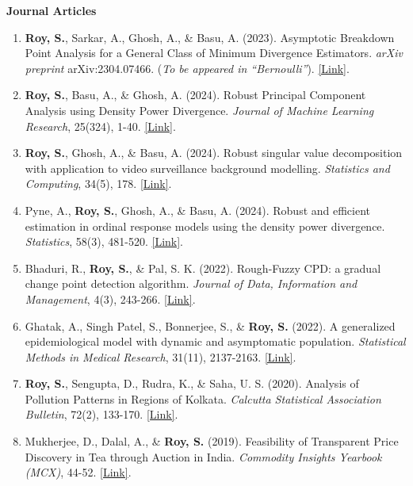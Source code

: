 \documentclass[10pt]{developercv} %
\begin{document}
\vspace{-15 pt}

\textbf{Journal Articles}
\begin{enumerate}
    \item \textbf{Roy, S.}, Sarkar, A., Ghosh, A., \& Basu, A. (2023). Asymptotic Breakdown Point Analysis for a General Class of Minimum Divergence Estimators. \emph{arXiv preprint} arXiv:2304.07466. (\textit{To be appeared in ``Bernoulli''}). \href{https://arxiv.org/abs/2304.07466}{[Link]}.
    \item \textbf{Roy, S.}, Basu, A., \& Ghosh, A. (2024). Robust Principal Component Analysis using Density Power Divergence. \emph{Journal of Machine Learning Research}, 25(324), 1-40. \href{https://www.jmlr.org/papers/v25/23-1096.html}{[Link]}.
    \item \textbf{Roy, S.}, Ghosh, A., \& Basu, A. (2024). Robust singular value decomposition with application to video surveillance background modelling. \emph{Statistics and Computing}, 34(5), 178. \href{https://link.springer.com/article/10.1007/s11222-024-10493-7}{[Link]}.
    \item Pyne, A., \textbf{Roy, S.}, Ghosh, A., \& Basu, A. (2024). Robust and efficient estimation in ordinal response models using the density power divergence. \emph{Statistics}, 58(3), 481-520. \href{https://www.tandfonline.com/doi/abs/10.1080/02331888.2024.2347329}{[Link]}.        
    \item Bhaduri, R., \textbf{Roy, S.}, \& Pal, S. K. (2022). Rough-Fuzzy CPD: a gradual change point detection algorithm. \emph{Journal of Data, Information and Management}, 4(3), 243-266. \href{https://link.springer.com/article/10.1007/s42488-022-00077-3}{[Link]}.
    \item Ghatak, A., Singh Patel, S., Bonnerjee, S., \& \textbf{Roy, S.} (2022). A generalized epidemiological model with dynamic and asymptomatic population. \emph{Statistical Methods in Medical Research}, 31(11), 2137-2163. \href{https://journals.sagepub.com/doi/abs/10.1177/09622802221115877}{[Link]}.
    \item \textbf{Roy, S.}, Sengupta, D., Rudra, K., \& Saha, U. S. (2020). Analysis of Pollution Patterns in Regions of Kolkata. \emph{Calcutta Statistical Association Bulletin}, 72(2), 133-170. \href{https://journals.sagepub.com/doi/abs/10.1177/0008068320976781}{[Link]}.
    \item Mukherjee, D., Dalal, A., \& \textbf{Roy, S.} (2019). Feasibility of Transparent Price Discovery in Tea through Auction in India. \emph{Commodity Insights Yearbook (MCX)}, 44-52. \href{https://www.mcxindia.com/docs/default-source/about-us/commodity-insights-yearbook/2019/02-emerging-trends/feasibility-of-transparent-price-discovery-in-tea-through-auction-in-india-dr-diganta-mukherjee-mr-abhinandan-dalal-and-mr-subhrajyoty-roy.pdf}{[Link]}.
\end{enumerate}
\end{document}
